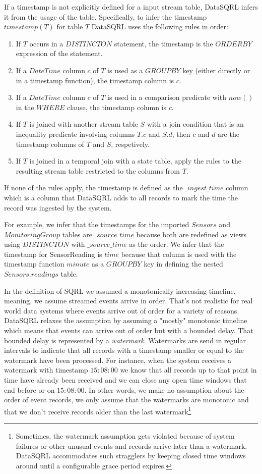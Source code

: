 \documentclass[	DIV=calc,%
							paper=letter,%
							fontsize=11pt,%
							twocolumn]{scrartcl}	 					%
\begin{document}
If a timestamp is not explicitly defined for a input stream table, DataSQRL infers it from the usage of the table. Specifically, to infer the timestamp $timestamp(T)$ for table $T$ DataSQRL uses the following rules in order:
\begin{enumerate}
    \item If $T$ occurs in a $DISTINCT ON$ statement, the timestamp is the $ORDER BY$ expression of the statement.
    \item If a $DateTime$ column $c$ of $T$ is used as a $GROUP BY$ key (either directly or in a timestamp function), the timestamp column is $c$.
    \item If a $DateTime$ column $c$ of $T$ is used in a comparison predicate with $now()$ in the $WHERE$ clause, the timestamp column is $c$.
    \item If $T$ is joined with another stream table $S$ with a join condition that is an inequality predicate involving columns $T.c$ and $S.d$, then $c$ and $d$ are the timestamp columns of $T$ and $S$, respetively.
    \item If $T$ is joined in a temporal join with a state table, apply the rules to the resulting stream table restricted to the columns from $T$.
\end{enumerate}

If none of the rules apply, the timestamp is defined as the $\_ingest\_time$ column which is a column that DataSQRL adds to all records to mark the time the record was ingested by the system.

For example, we infer that the timestamps for the imported $Sensors$ and $MonitoringGroup$ tables are $\_source\_time$ because both are redefined as views using $DISTINCT ON$ with $\_source\_time$ as the order. We infer that the timestamp for SensorReading is $time$ because that column is used with the timestamp function $minute$ as a $GROUP BY$ key in defining the nested $Sensors.readings$ table.

In the definition of SQRL we assumed a monotonically increasing timeline, meaning, we assume streamed events arrive in order. That's not realistic for real world data systems where events arrive out of order for a variety of reasons. DataSQRL relaxes the assumption by assuming a "mostly" monotonic timeline which means that events can arrive out of order but with a bounded delay. That bounded delay is represented by a \emph{watermark}. Watermarks are send in regular intervals to indicate that all records with a timestamp smaller or equal to the watermark have been processed. For instance, when the system receives a watermark with timestamp $15:08:00$ we know that all records up to that point in time have already been received and we can close any open time windows that end before or on $15:08:00$. In other words, we make no assumption about the order of event records, we only assume that the watermarks are monotonic and that we don't receive records older than the last watermark\footnote{Sometimes, the watermark assumption gets violated because of system failures or other unusual events and records arrive later than a watermark. DataSQRL accommodates such stragglers by keeping closed time windows around until a configurable grace period expires.}
\end{document}
